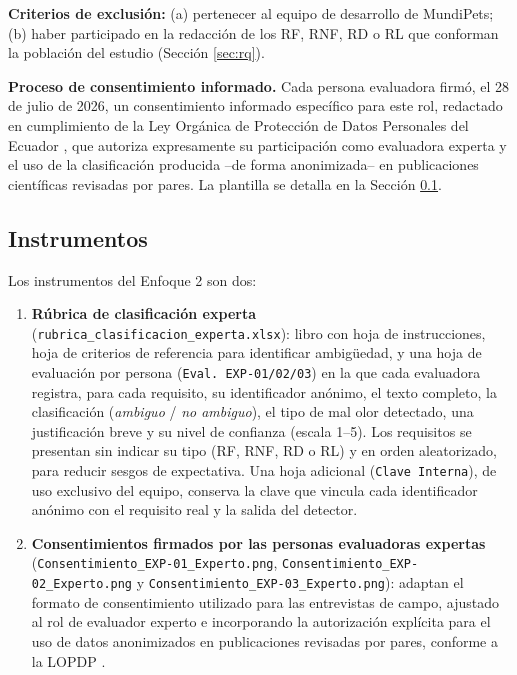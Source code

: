 \documentclass[journal,onecolumn]{IEEEtran}
\begin{document}
	\textbf{Criterios de exclusión:} (a) pertenecer al equipo de desarrollo de
	MundiPets; (b) haber participado en la redacción de los RF, RNF, RD o RL que
	conforman la población del estudio (Sección \ref{sec:rq}).
	
	\textbf{Proceso de consentimiento informado.} Cada persona evaluadora firmó,
	el 28 de julio de 2026, un consentimiento informado específico para este rol,
	redactado en cumplimiento de la Ley Orgánica de Protección de Datos
	Personales del Ecuador \cite{lopdp2021}, que autoriza expresamente su
	participación como evaluadora experta y el uso de la clasificación
	producida --de forma anonimizada-- en publicaciones científicas revisadas
	por pares. La plantilla se detalla en la Sección \ref{sec:instrumentos}.
	
	\subsection{Instrumentos}
	\label{sec:instrumentos}
	
	Los instrumentos del Enfoque 2 son dos:
	
	\begin{enumerate}[leftmargin=*]
		\item \textbf{Rúbrica de clasificación experta}
		(\texttt{rubrica\_clasificacion\_experta.xlsx}): libro con hoja de
		instrucciones, hoja de criterios de referencia para identificar
		ambigüedad, y una hoja de evaluación por persona (\texttt{Eval.
		EXP-01/02/03}) en la que cada evaluadora registra, para cada requisito,
		su identificador anónimo, el texto completo, la clasificación
		(\emph{ambiguo} / \emph{no ambiguo}), el tipo de mal olor detectado, una
		justificación breve y su nivel de confianza (escala 1--5). Los
		requisitos se presentan sin indicar su tipo (RF, RNF, RD o RL) y en
		orden aleatorizado, para reducir sesgos de expectativa. Una hoja
		adicional (\texttt{Clave Interna}), de uso exclusivo del equipo,
		conserva la clave que vincula cada identificador anónimo con el
		requisito real y la salida del detector.
		\item \textbf{Consentimientos firmados por las personas evaluadoras
		expertas} (\texttt{Consentimiento\_EXP-01\_Experto.png},
		\texttt{Consentimiento\_EXP-02\_Experto.png} y
		\texttt{Consentimiento\_EXP-03\_Experto.png}): adaptan el formato
		de consentimiento utilizado para las entrevistas de campo, ajustado al
		rol de evaluador experto e incorporando la autorización explícita
		para el uso de datos anonimizados en publicaciones revisadas por
		pares, conforme a la LOPDP \cite{lopdp2021}.
	\end{enumerate}
	
\end{document}
